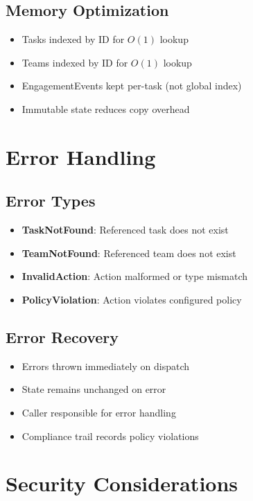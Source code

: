 \documentclass[12pt,a4paper]{article}
\begin{document}
\subsection{Memory Optimization}

\begin{itemize}
  \item Tasks indexed by ID for $O(1)$ lookup
  \item Teams indexed by ID for $O(1)$ lookup
  \item EngagementEvents kept per-task (not global index)
  \item Immutable state reduces copy overhead
\end{itemize}

\section{Error Handling}

\subsection{Error Types}

\begin{itemize}
  \item \textbf{TaskNotFound}: Referenced task does not exist
  \item \textbf{TeamNotFound}: Referenced team does not exist
  \item \textbf{InvalidAction}: Action malformed or type mismatch
  \item \textbf{PolicyViolation}: Action violates configured policy
\end{itemize}

\subsection{Error Recovery}

\begin{itemize}
  \item Errors thrown immediately on dispatch
  \item State remains unchanged on error
  \item Caller responsible for error handling
  \item Compliance trail records policy violations
\end{itemize}

\section{Security Considerations}
\end{document}
